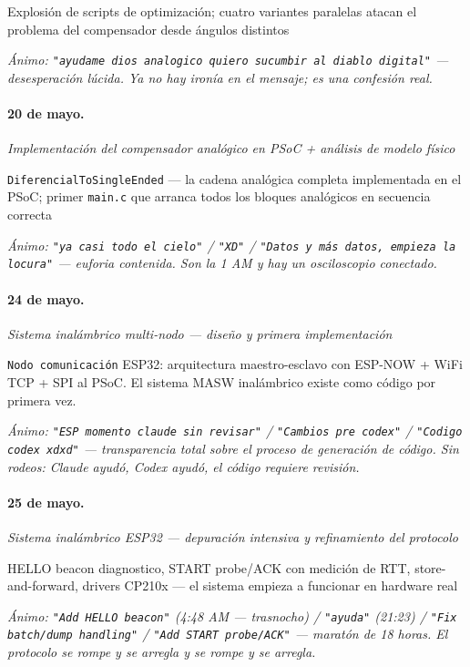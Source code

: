 Explosión de scripts de optimización; cuatro variantes paralelas atacan el problema del compensador desde ángulos distintos

{\footnotesize\itshape \'Animo: \texttt{"ayudame dios analogico quiero sucumbir al diablo digital"} --- desesperación lúcida. Ya no hay ironía en el mensaje; es una confesión real.}

\paragraph{20 de mayo.}
\emph{Implementación del compensador analógico en PSoC + análisis de modelo físico}

\texttt{DiferencialToSingleEnded} --- la cadena analógica completa implementada en el PSoC; primer \texttt{main.c} que arranca todos los bloques analógicos en secuencia correcta

{\footnotesize\itshape \'Animo: \texttt{"ya casi todo el cielo"} / \texttt{"XD"} / \texttt{"Datos y más datos, empieza la locura"} --- euforia contenida. Son la 1 AM y hay un osciloscopio conectado.}

\paragraph{24 de mayo.}
\emph{Sistema inalámbrico multi-nodo --- diseño y primera implementación}

\texttt{Nodo comunicación} ESP32: arquitectura maestro-esclavo con ESP-NOW + WiFi TCP + SPI al PSoC. El sistema MASW inalámbrico existe como código por primera vez.

{\footnotesize\itshape \'Animo: \texttt{"ESP momento claude sin revisar"} / \texttt{"Cambios pre codex"} / \texttt{"Codigo codex xdxd"} --- transparencia total sobre el proceso de generación de código. Sin rodeos: Claude ayudó, Codex ayudó, el código requiere revisión.}

\paragraph{25 de mayo.}
\emph{Sistema inalámbrico ESP32 --- depuración intensiva y refinamiento del protocolo}

HELLO beacon diagnostico, START probe/ACK con medición de RTT, store-and-forward, drivers CP210x --- el sistema empieza a funcionar en hardware real

{\footnotesize\itshape \'Animo: \texttt{"Add HELLO beacon"} (4:48 AM --- trasnocho) / \texttt{"ayuda"} (21:23) / \texttt{"Fix batch/dump handling"} / \texttt{"Add START probe/ACK"} --- maratón de 18 horas. El protocolo se rompe y se arregla y se rompe y se arregla.}

